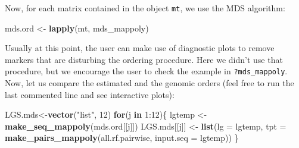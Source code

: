 \documentclass[
]{article}
\newenvironment{Shaded}{}{}
\newcommand{\ControlFlowTok}[1]{\textcolor[rgb]{0.00,0.44,0.13}{\textbf{#1}}}
\newcommand{\DataTypeTok}[1]{\textcolor[rgb]{0.56,0.13,0.00}{#1}}
\newcommand{\DecValTok}[1]{\textcolor[rgb]{0.25,0.63,0.44}{#1}}
\newcommand{\KeywordTok}[1]{\textcolor[rgb]{0.00,0.44,0.13}{\textbf{#1}}}
\newcommand{\NormalTok}[1]{#1}
\newcommand{\OperatorTok}[1]{\textcolor[rgb]{0.40,0.40,0.40}{#1}}
\newcommand{\StringTok}[1]{\textcolor[rgb]{0.25,0.44,0.63}{#1}}
\begin{document}
\begin{Shaded}
\end{Shaded}

Now, for each matrix contained in the object \texttt{mt}, we use the MDS
algorithm:

\begin{Shaded}
\begin{Highlighting}[]
\NormalTok{mds.ord <-}\StringTok{ }\KeywordTok{lapply}\NormalTok{(mt, mds_mappoly)}
\end{Highlighting}
\end{Shaded}

Usually at this point, the user can make use of diagnostic plots to
remove markers that are disturbing the ordering procedure. Here we
didn't use that procedure, but we encourage the user to check the
example in \texttt{?mds\_mappoly}. Now, let us compare the estimated and
the genomic orders (feel free to run the last commented line and see
interactive plots):

\begin{Shaded}
\begin{Highlighting}[]
\NormalTok{LGS.mds<-}\KeywordTok{vector}\NormalTok{(}\StringTok{"list"}\NormalTok{, }\DecValTok{12}\NormalTok{)}
\ControlFlowTok{for}\NormalTok{(j }\ControlFlowTok{in} \DecValTok{1}\OperatorTok{:}\DecValTok{12}\NormalTok{)\{}
\NormalTok{  lgtemp <-}\StringTok{ }\KeywordTok{make_seq_mappoly}\NormalTok{(mds.ord[[j]])}
\NormalTok{  LGS.mds[[j]] <-}\StringTok{ }\KeywordTok{list}\NormalTok{(}\DataTypeTok{lg =}\NormalTok{ lgtemp, }
      \DataTypeTok{tpt =} \KeywordTok{make_pairs_mappoly}\NormalTok{(all.rf.pairwise, }\DataTypeTok{input.seq =}\NormalTok{ lgtemp))}
\NormalTok{\}}
\end{Highlighting}
\end{Shaded}
\end{document}
